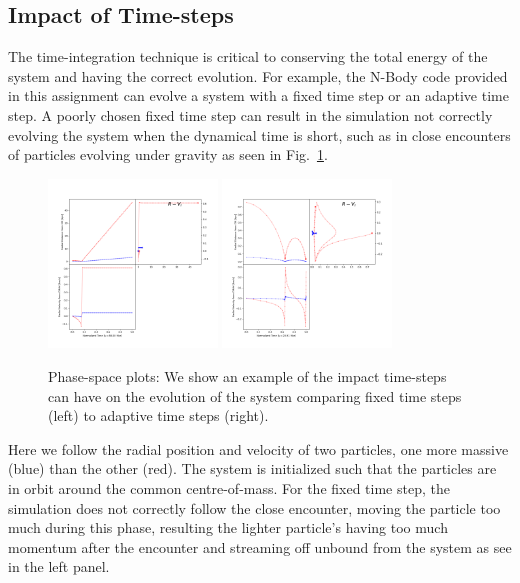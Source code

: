 \subsection{Impact of Time-steps}
\label{sec:nbody:timestep}
The time-integration technique is critical to conserving the total energy of the system and having the correct evolution. For example, the N-Body code provided in this assignment can evolve a system with a fixed time step or an adaptive time step. A poorly chosen fixed time step can result in the simulation not correctly evolving the system when the dynamical time is short, such as in close encounters of particles evolving under gravity as seen in Fig.~\ref{fig:nbody-orbits}. 
\begin{figure}[!h]	
	\centering
	\includegraphics[width=0.4\textwidth, valign=c, clip=true, trim=2.cm 2.cm 2.cm 2.cm]{figs/nbody-phase-plot-rad-static.png}
	\includegraphics[width=0.4\textwidth, valign=c, clip=true, trim=2.cm 2.cm 2.cm 2.cm]{figs/nbody-phase-plot-rad-adaptive.png}
	\caption{Phase-space plots: We show an example of the impact time-steps can have on the evolution of the system comparing fixed time steps (left) to adaptive time steps (right).}
	\label{fig:nbody-orbits}
\end{figure}

\par 
Here we follow the radial position and velocity of two particles, one more massive (blue) than the other (red). The system is initialized such that the particles are in orbit around the common centre-of-mass. For the fixed time step, the simulation does not correctly follow the close encounter, moving the particle too much during this phase, resulting the lighter particle's having too much momentum after the encounter and streaming off unbound from the system as see in the left panel. 


